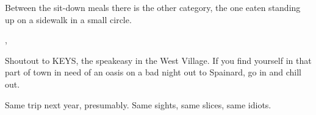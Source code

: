 Between the sit-down meals there is the other category, the one eaten standing
up on a sidewalk in a small circle.


\sep

Shoutout to KEYS, the speakeasy in the West Village. If you find yourself in
that part of town in need of an oasis on a bad night out to Spainard, go in and chill out.


Same trip next year, presumably. Same sights, same slices, same idiots.


